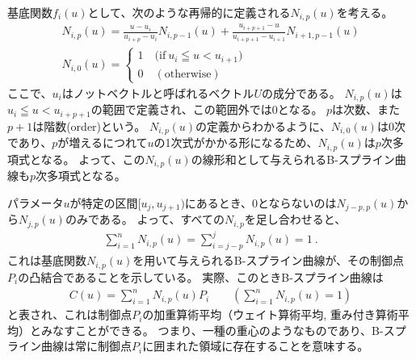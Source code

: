 \clearpage
基底関数$f_i(u)$として、次のような再帰的に定義される$N_{i, p}(u)$を考える。
\begin{gather*}
  N_{i, p}(u)
  = \frac{u-u_i}{u_{i+p}-u_i}N_{i, p-1}(u)
    +\frac{u_{i+p+1}-u}{u_{i+p+1}-u_{i+1}}N_{i+1, p-1}(u)\\
  N_{i, 0}(u)
  = \left\{
    \begin{array}{l}
      1\quad \big(\text{if}~u_i \leqq u < u_{i+1}\big)\\
      0\quad (\text{otherwise})
    \end{array}
    \right.
\end{gather*}
ここで、$u_i$はノットベクトルと呼ばれるベクトル$U$の成分である。
$N_{i, p}(u)$は$u_i \leqq u < u_{i+p+1}$の範囲で定義され、この範囲外では$0$となる。
$p$は次数、また$p+1$は階数(order)という。
$N_{i, p}(u)$の定義からわかるように、$N_{i, 0}(u)$は0次であり、$p$が増えるにつれて$u$の1次式がかかる形になるため、$N_{i, p}(u)$は$p$次多項式となる。
よって、この$N_{i, p}(u)$の線形和として与えられるB-スプライン曲線も$p$次多項式となる。

パラメータ$u$が特定の区間$[u_j , u_{j+1})$にあるとき、0とならないのは$N_{j-p, p}(u)$から$N_{j, p}(u)$のみである。
よって、すべての$N_{i, p}$を足し合わせると、
\begin{align*}
  \sum_{i=1}^nN_{i, p}(u) = \sum_{i=j-p}^j\!\!N_{i, p}(u) = 1\ .
\end{align*}
これは基底関数$N_{i, p}(u)$を用いて与えられるB-スプライン曲線が、その制御点$P_i$の凸結合であることを示している。
実際、このときB-スプライン曲線は
\begin{align*}
  C(u) = \sum_{i=1}^nN_{i, p}(u)P_i\qquad\left(\sum_{i=1}^nN_{i, p}(u) =1\right)
\end{align*}
と表され、これは制御点$P_i$の加重算術平均（ウェイト算術平均, 重み付き算術平均）とみなすことができる。
つまり、一種の重心のようなものであり、B-スプライン曲線は常に制御点$P_i$に囲まれた領域に存在することを意味する。

